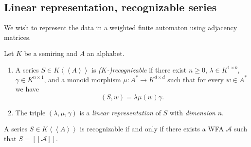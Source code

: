 \subsection{Linear representation, recognizable series}
We wish to represent the data in a weighted finite automaton using adjacency matrices.
\begin{definition}
    Let $K$ be a semiring and $A$ an alphabet.
    \begin{enumerate}[(1)]
        \item A series $S \in K \left<\left<A\right>\right>$ is \emph{($K$-)recognizable}
        if there exist $n \ge 0$, $\lambda \in K^{1 \times b}$, $\gamma \in K^{n \times 1}$,
        and a monoid morphism $\mu \colon A^* \to K^{d \times d}$ such that for every 
        $w \in A^*$ we have
        \[
            (S, w) = \lambda \mu(w) \gamma.
        \]
        \item The triple $(\lambda, \mu, \gamma)$ is a \emph{linear representation}
        of $S$ with \emph{dimension} $n$.
    \end{enumerate}
\end{definition}

\begin{proposition}
    A series $S \in K \left<\left<A\right>\right>$ is recognizable if and only 
    if there exists a WFA $\mathcal{A}$ such that $S = [[\mathcal{A}]]$.
\end{proposition}

